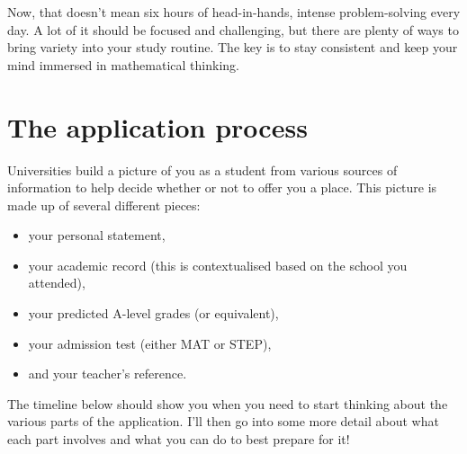 \documentclass[11pt]{article}
\newif\ifshowcomments
\newif\ifshowpersonal
\newcommand{\comment}[1]{\ifshowcomments\textcolor{myblue}{\textbf{#1}}\fi}
\newcommand{\personal}[1]{\ifshowpersonal\textcolor{myorange}{\emph{#1}}\fi}
\begin{document}
Now, that doesn’t mean six hours of head-in-hands, intense problem-solving every day. A lot of it should be focused and challenging, but there are plenty of ways to bring variety into your study routine. The key is to stay consistent and keep your mind immersed in mathematical thinking.




\section{The application process}

Universities build a picture of you as a student from various sources of information to help decide whether or not to offer you a place. This picture is made up of several different pieces:
\begin{itemize}
\item your personal statement,
\item your academic record (this is contextualised based on the school you attended),
\item your predicted A-level grades (or equivalent),
\item your admission test (either MAT or STEP),
\item and your teacher's reference.
\end{itemize}
 

The timeline below should show you when you need to start thinking about the various parts of the application. I'll then go into some more detail about what each part involves and what you can do to best prepare for it!
\end{document}
